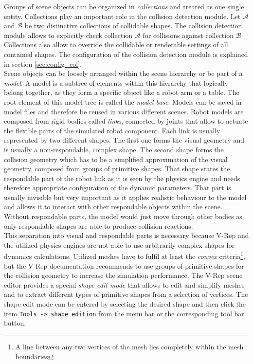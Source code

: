 Groups of scene objects can be organized in \emph{collections} and treated as one single entity. Collections play an important role in the collision detection module. Let $\mathcal{A}$ and $\mathcal{B}$ be two distinctive collections of collidable shapes. The collision detection module allows to explicitly check collection $\mathcal{A}$ for collisions against collection $\mathcal{B}$. Collections also allow to override the collidable or renderable settings of all contained shapes. The configuration of the collision detection module is explained in section \ref{sec:config_col}. \\

Scene objects can be loosely arranged within the scene hierarchy or be part of a \emph{model}. A model is a subtree of elements within this hierarchy that logically belong together, as they form a specific object like a robot arm or a table. The root element of this model tree is called the \emph{model base}. Models can be saved in model files and therefore be reused in various different scenes. Robot models are composed from rigid bodies called \emph{links}, connected by joints that allow to actuate the flexible parts of the simulated robot component. Each link is usually represented by two different shapes. The first one forms the visual geometry and is usually a non-respondable, complex shape. The second shape forms the collision geometry which has to be a simplified approximation of the visual geometry, composed from groups of primitive shapes. That shape states the respondable part of the robot link as it is seen by the physics engine and needs therefore appropriate configuration of the dynamic parameters. That part is usually invisible but very important as it applies realistic behaviour to the model and allows it to interact with other respondable objects within the scene. Without respondable parts, the model would just move through other bodies as only respondable shapes are able to produce collision reactions. \\

This separation into visual and respondable parts is necessary because V-Rep and the utilized physics engines are not able to use arbitrarily complex shapes for dynamics calculations. Utilized meshes have to fulfil at least the \emph{convex} criteria\footnote{A line between any two vertices of the mesh lies completely within the mesh boundaries}, but the V-Rep documentation recommends to use groups of primitive shapes for the collision geometry to increase the simulation performance. The V-Rep scene editor provides a special \emph{shape edit mode} that allows to edit and simplify meshes and to extract different types of primitive shapes from a selection of vertices. The shape edit mode can be entered by selecting the desired shape and then click the item \texttt{Tools -> shape edition} from the menu bar or the corresponding tool bar button.

